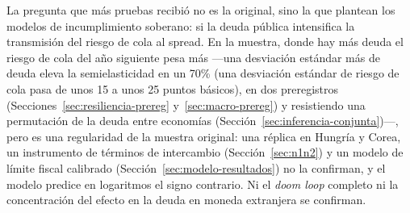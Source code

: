 La pregunta que más pruebas recibió no es la original, sino la que plantean los modelos de incumplimiento soberano: si la deuda pública intensifica la transmisión del riesgo de cola al spread. En la muestra, donde hay más deuda el riesgo de cola del año siguiente pesa más ---una desviación estándar más de deuda eleva la semielasticidad en un 70\% (una desviación estándar de riesgo de cola pasa de unos 15 a unos 25 puntos básicos), en dos preregistros (Secciones~\ref{sec:resiliencia-prereg} y~\ref{sec:macro-prereg}) y resistiendo una permutación de la deuda entre economías (Sección~\ref{sec:inferencia-conjunta})---, pero es una regularidad de la muestra original: una réplica en Hungría y Corea, un instrumento de términos de intercambio (Sección~\ref{sec:n1n2}) y un modelo de límite fiscal calibrado (Sección~\ref{sec:modelo-resultados}) no la confirman, y el modelo predice en logaritmos el signo contrario. Ni el \textit{doom loop} completo ni la concentración del efecto en la deuda en moneda extranjera se confirman.

